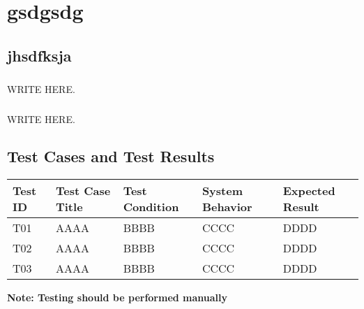 \chapter{gsdgsdg}
\section{jhsdfksja}
\paragraph{} WRITE HERE.
\paragraph{} WRITE HERE.
\section{Test Cases and Test Results}
\begin{longtable}{ | p{1cm} | p{3.5cm} | p{4cm} | p{4cm} | p{4cm} |}
      \hline
      \textbf{Test ID} & \textbf{Test Case Title} & \textbf{Test Condition} & \textbf{System Behavior} & \textbf{Expected Result}\\
      \hline
      T01 & AAAA & BBBB & CCCC & DDDD\\
      \hline
      T02 & AAAA & BBBB & CCCC & DDDD\\
      \hline
      T03 & AAAA & BBBB & CCCC & DDDD\\
      \hline
\end{longtable}

\textbf{Note: Testing should be performed manually}